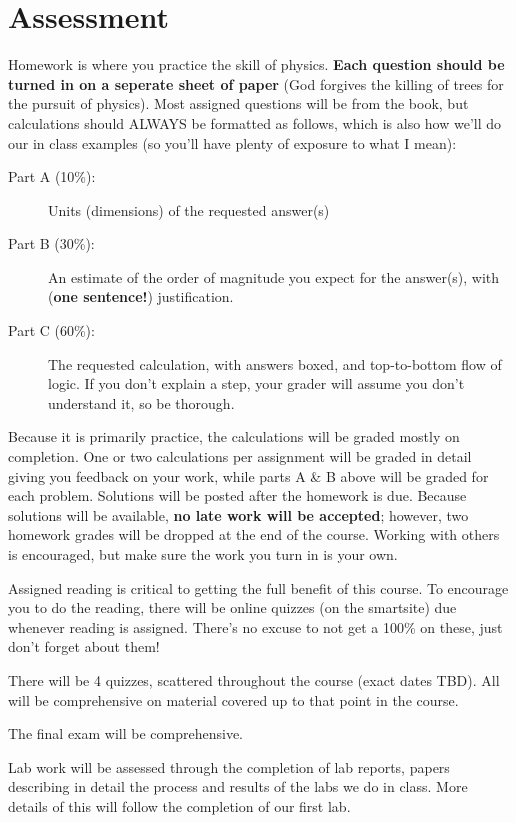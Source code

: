\documentclass[12pt]{article}
\begin{document}
\section*{Assessment}
\begin{description}
\setlength{\itemsep}{2pt}
\setlength{\parskip}{2pt}
\item[{Weekly Homework (25\%):}] Homework is where you practice the skill of physics. {\bf Each question should be turned in on a seperate sheet of paper} (God forgives the killing of trees for the pursuit of physics). Most assigned questions will be from the book, but calculations should ALWAYS be formatted as follows, which is also how we'll do our in class examples (so you'll have plenty of exposure to what I mean):
	\begin{description}
	\item[{\rm Part A (10\%):}] Units (dimensions) of the requested answer(s)
	\item[{\rm Part B (30\%):}] An estimate of the order of magnitude you expect for the answer(s), with ({\bf one sentence!}) justification.
	\item[{\rm Part C (60\%):}] The requested calculation, with answers boxed, and top-to-bottom flow of logic. If you don't explain a step, your grader will assume you don't understand it, so be thorough.
	\end{description}
\medskip

\noindent Because it is primarily practice, the calculations will be graded mostly on completion. One or two calculations per assignment will be graded in detail giving you feedback on your work, while parts A \& B above will be graded for each problem. Solutions will be posted after the homework is due. Because solutions will be available, {\bf no late work will be accepted}; however, two homework grades will be dropped at the end of the course. Working with others is encouraged, but make sure the work you turn in is your own.
\item[{Reading Quizzes (10\%):}] Assigned reading is critical to getting the full benefit of this course. To encourage you to do the reading, there will be online quizzes (on the smartsite) due whenever reading is assigned. There's no excuse to not get a 100\% on these, just don't forget about them! 
\item[Quizzes (35\%):] There will be 4 quizzes, scattered throughout the course (exact dates TBD). All will be comprehensive on material covered up to that point in the course.
\item[{Final Exam (30\%):}] The final exam will be comprehensive.
\item[{Labs:}] Lab work will be assessed through the completion of lab reports, papers describing in detail the process and results of the labs we do in class. More details of this will follow the completion of our first lab.
\end{description}
\end{document}
